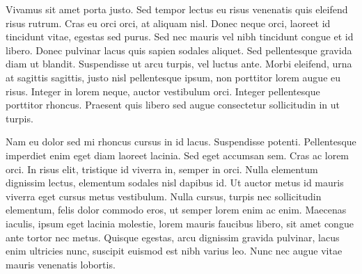 Vivamus sit amet porta justo. Sed tempor lectus eu risus venenatis quis eleifend risus rutrum. Cras eu orci orci, at aliquam nisl. Donec neque orci, laoreet id tincidunt vitae, egestas sed purus. Sed nec mauris vel nibh tincidunt congue et id libero. Donec pulvinar lacus quis sapien sodales aliquet. Sed pellentesque gravida diam ut blandit. Suspendisse ut arcu turpis, vel luctus ante. Morbi eleifend, urna at sagittis sagittis, justo nisl pellentesque ipsum, non porttitor lorem augue eu risus. Integer in lorem neque, auctor vestibulum orci. Integer pellentesque porttitor rhoncus. Praesent quis libero sed augue consectetur sollicitudin in ut turpis.

Nam eu dolor sed mi rhoncus cursus in id lacus. Suspendisse potenti. Pellentesque imperdiet enim eget diam laoreet lacinia. Sed eget accumsan sem. Cras ac lorem orci. In risus elit, tristique id viverra in, semper in orci. Nulla elementum dignissim lectus, elementum sodales nisl dapibus id. Ut auctor metus id mauris viverra eget cursus metus vestibulum. Nulla cursus, turpis nec sollicitudin elementum, felis dolor commodo eros, ut semper lorem enim ac enim. Maecenas iaculis, ipsum eget lacinia molestie, lorem mauris faucibus libero, sit amet congue ante tortor nec metus. Quisque egestas, arcu dignissim gravida pulvinar, lacus enim ultricies nunc, suscipit euismod est nibh varius leo. Nunc nec augue vitae mauris venenatis lobortis. 

